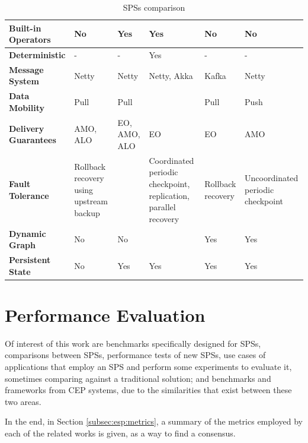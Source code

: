 \documentclass[ppgc,diss,english]{iiufrgs}
\begin{document}
\begin{table}[t]
\begin{center}
\begin{tabular}{ | p{2.5cm} | p{2cm} | p{2.5cm} | p{2.5cm} | p{2cm} | p{2cm} |}
        \textbf{Built-in Operators}      & No & Yes & Yes & No & No \\\hline
        \textbf{Deterministic}           & - & - & Yes & - & - \\\hline
        
        \textbf{Message System}          & Netty & Netty & Netty, Akka & Kafka & Netty \\\hline
        \textbf{Data Mobility}\cite{kamburugamuvesurvey}          & Pull & Pull &  & Pull & Push \\\hline
        \textbf{Delivery Guarantees}\cite{bockermann2014survey}    & AMO, ALO & EO, AMO, ALO & EO & EO & AMO \\\hline
        \textbf{Fault Tolerance}\cite{gradvohl2014comparing}         & Rollback recovery using upstream backup &  & Coordinated periodic checkpoint, replication, parallel recovery & Rollback recovery \cite{kamburugamuvesurvey}  & Uncoordinated periodic checkpoint \\\hline
        \textbf{Dynamic Graph}           & No & No &  & Yes & Yes \\\hline
        \textbf{Persistent State}        & No & Yes & Yes & Yes & Yes \\\hline
        
	\end{tabular}
	\begin{flushleft}
	\end{flushleft}
	\caption{SPSs comparison}
	\label{table:sps_comparison}
\end{center}
\end{table}

\section{Performance Evaluation}
\label{sec:esp:performance_evaluation}

Of interest of this work are benchmarks specifically designed for SPSs, comparisons between SPSs, performance tests of new SPSs, use cases of applications that employ an SPS and perform some experiments to evaluate it, sometimes comparing against a traditional solution; and benchmarks and frameworks from CEP systems, due to the similarities that exist between these two areas.

In the end, in Section \ref{subsec:esp:metrics}, a summary of the metrics employed by each of the related works is given, as a way to find a consensus.
\end{document}
